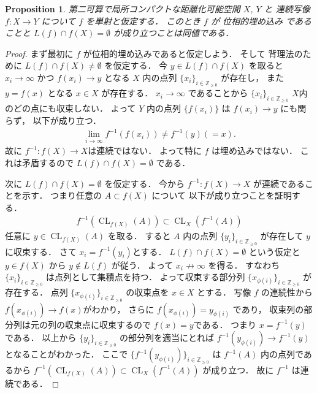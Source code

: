 \documentclass[leqno, a4paper, 12pt]{jsarticle}
\theoremstyle{plain}
\newtheorem{prop}[thm]{Proposition}
\theoremstyle{definition}
\theoremstyle{remark}
\newcommand{\zz}{\mathbb{Z}}
\DeclareMathOperator{\cl}{\mathrm{CL}}
\newcommand{\yolimset}[1]{L(#1)}
\numberwithin{equation}{section}
\begin{document}
\begin{prop}\label{ume}
第二可算で局所コンパクトな距離化可能空間
$X$, 
$Y$
と
連続写像
$f\colon X\to Y$
について
$f$
を単射と仮定する．
このとき
$f$
が
位相的埋め込み
であることと
$\yolimset{f}\cap f(X)=\emptyset$
が成り立つことは同値である．
\end{prop}
\begin{proof}
まず最初に
$f$
が位相的埋め込みであると仮定しよう．
そして
背理法のために
$\yolimset{f}\cap f(X)\neq\emptyset$
を仮定する．
今
$y\in  \yolimset{f}\cap f(X)$
を取ると
$x_{i}\to \infty$
かつ
$f(x_{i})\to y$
となる
$X$
内の点列
$\{x_{i}\}_{i\in \zz_{\ge 0}}$
が存在し，
また
$y=f(x)$
となる
$x\in X$
が存在する．
$x_{i}\to \infty$
であることから
$\{x_{i}\}_{i\in \zz_{\ge 0}}$
$X$内のどの点にも収束しない．
よって
$Y$
内の点列
$\{f(x_{i})\}$
は
$f(x_{i})\to y$
にも関らず，
以下が成り立つ．
\begin{align}
\lim_{i\to \infty}f^{-1}(f(x_i))\neq f^{-1}(y)(=x). 
\end{align}
故に
$f^{-1}\colon f(X)\to X$は連続ではない．
よって特に
$f$
は埋め込みではない．
これは矛盾するので
$\yolimset{f}\cap f(X)=\emptyset$
である．

次に
$ \yolimset{f}\cap f(X)=\emptyset$
を仮定する．
今から
$f^{-1}\colon f(X)\to X$
が連続であることを示す．
つまり任意の
$A\subset f(X)$
について
以下が成り立つことを証明する．
\begin{align}
f^{-1}(\cl_{f(X)}(A))\subset \cl_X(f^{-1}(A))
\end{align}
任意に
$y\in \cl_{f(X)}(A)$
を取る．
すると
$A$
内の点列
$\{y_{i}\}_{i\in \zz_{\ge 0}}$
が存在して
$y$
に収束する．
さて
$x_{i}=f^{-1}(y_{i})$とする．
$\yolimset{f}\cap f(X)=\emptyset$
という仮定と
$y\in f(X)$
から
$y\not\in \yolimset{f}$
が従う．
よって
$x_{i}\not\to \infty$
を得る．
すなわち
$\{x_{i}\}_{i\in \zz_{\ge 0}}$
は点列として集積点を持つ．
よって収束する部分列
$\{x_{\phi(i)}\}_{i\in \zz_{\ge 0}}$
が存在する．
点列
$\{x_{\phi(i)}\}_{i\in \zz_{\ge 0}}$
の収束点を
$x\in X$
とする．
写像
$f$
の連続性から
$f(x_{\phi(i)})\to f(x)$がわかり，
さらに
$f(x_{\phi(i)})=y_{\phi(i)}$
であり，
収束列の部分列は元の列の収束点に収束するので
$f(x)=y$である．
つまり
$x=f^{-1}(y)$
である．
以上から
$\{y_{i}\}_{i\in \zz_{\ge 0}}$
の部分列を適当にとれば
$f^{-1}(y_{\phi(i)})\to f^{-1}(y)$
となることがわかった．
ここで
$\{f^{-1}(y_{\phi(i)})\}_{i\in \zz_{\ge 0}}$
は
$f^{-1}(A)$
内の点列であるから
$f^{-1}(\cl_{f(X)}(A))\subset \cl_X(f^{-1}(A))$
が成り立つ．
故に
$f^{-1}$
は連続である．
\end{proof}
\end{document}
